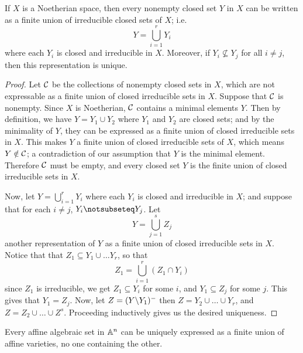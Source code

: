 \begin{lemma}\label{lemma_1.1.5}
    If $X$ is a Noetherian space, then every nonempty closed set  $Y$ in  $X$
    can be written as a finite union of irreducible closed sets of  $X$; i.e.
    \begin{equation*}
        Y=\bigcup_{i=1}^r{Y_i}
    \end{equation*}
    where each $Y_i$ is closed and irreducible in $X$. Moreover, if $Y_i
    \not\subseteq Y_j$ for all  $i \neq j$, then this representation is unique.
\end{lemma}
\begin{proof}
    Let $\mathcal{C}$ be the collections of nonempty closed sets in  $X$, which are not
    expressable as a finite union of closed irreducible sets in  $X$. Suppose
    that $\mathcal{C}$ is nonempty. Since $X$ is Noetherian, $\mathcal{C}$ contains a minimal
    elements $Y$. Then by definition, we have $Y=Y_1 \cup Y_2$ where $Y_1$ and
    $Y_2$ are closed sets; and by the minimality of $Y$, they can be expressed
    as a finite union of closed irreducible sets in $X$. This makes $Y$ a finite
    union of closed irreducible sets of  $X$, which means  $Y \notin \mathcal{C}$; a
    contradiction of our assumption that  $Y$ is the minimal element. Therefore
     $\mathcal{C}$ must be empty, and every closed set  $Y$ is the finite union of
     closed irreducible sets in  $X$.

     Now, let  $Y=\bigcup_{i=1}^r{Y_i}$ where each $Y_i$ is closed and
     irreducible in  $X$; and suppose that for each  $i \neq j$,  $Y_i
     \notsubseteq Y_j$. Let
     \begin{equation*}
         Y=\bigcup_{j=1}^s{Z_j}
     \end{equation*}
     another representation of $Y$ as a finite union of closed irreducible sets
     in  $X$. Notice that that  $Z_1 \subseteq Y_1 \cup \dots Y_r$, so that
     \begin{equation*}
         Z_1=\bigcup_{i=1}^r{(Z_1 \cap Y_i)}
     \end{equation*}
     since $Z_1$ is irreducible, we get $Z_1 \subseteq Y_i$ for some $i$, and
     $Y_1 \subseteq Z_j$ for some $j$. This gives that $Y_1=Z_j$. Now, let
     $Z=(Y \backslash Y_1)^-$ then $Z=Y_2 \cup \dots \cup Y_r$, and $Z=Z_2 \cup
     \dots \cup Z^s$. Proceeding inductively gives us the desired uniqueness.
\end{proof}
\begin{corollary}
    Every affine algebraic set in $\mathbb{A}^n$ can be uniquely expressed as a finite
    union of affine varieties, no one containing the other.
\end{corollary}

